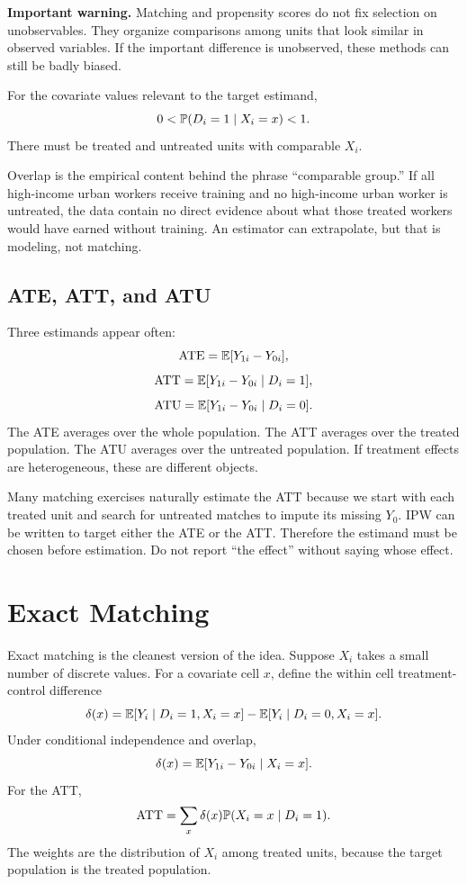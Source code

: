 \begin{boxF}
\textbf{Important warning.} Matching and propensity scores do not fix selection
on unobservables. They organize comparisons among units that look similar in
observed variables. If the important difference is unobserved, these methods
can still be badly biased.
\end{boxF}

\begin{assN}[Overlap]
For the covariate values relevant to the target estimand,
\[
    0 < \mathbb{P}(D_i=1\mid X_i=x) < 1.
\]
There must be treated and untreated units with comparable \(X_i\).
\end{assN}

Overlap is the empirical content behind the phrase ``comparable group.'' If all
high-income urban workers receive training and no high-income urban worker is
untreated, the data contain no direct evidence about what those treated workers
would have earned without training. An estimator can extrapolate, but that is
modeling, not matching.

\subsection{ATE, ATT, and ATU}

Three estimands appear often:
\[
    \mathrm{ATE} = \mathbb{E}[Y_{1i}-Y_{0i}],
\]
\[
    \mathrm{ATT} = \mathbb{E}[Y_{1i}-Y_{0i}\mid D_i=1],
\]
\[
    \mathrm{ATU} = \mathbb{E}[Y_{1i}-Y_{0i}\mid D_i=0].
\]
The ATE averages over the whole population. The ATT averages over the treated
population. The ATU averages over the untreated population. If treatment effects
are heterogeneous, these are different objects.

Many matching exercises naturally estimate the ATT because we start with each
treated unit and search for untreated matches to impute its missing \(Y_0\).
IPW can be written to target either the ATE or the ATT. Therefore the estimand
must be chosen before estimation. Do not report ``the effect'' without saying
whose effect.

\section{Exact Matching}

Exact matching is the cleanest version of the idea. Suppose \(X_i\) takes a
small number of discrete values. For a covariate cell \(x\), define the within
cell treatment-control difference
\[
    \delta(x)
    =
    \mathbb{E}[Y_i\mid D_i=1,X_i=x]
    -
    \mathbb{E}[Y_i\mid D_i=0,X_i=x].
\]
Under conditional independence and overlap,
\[
    \delta(x)
    =
    \mathbb{E}[Y_{1i}-Y_{0i}\mid X_i=x].
\]
For the ATT,
\[
    \mathrm{ATT}
    =
    \sum_x \delta(x)\mathbb{P}(X_i=x\mid D_i=1).
\]
The weights are the distribution of \(X_i\) among treated units, because the
target population is the treated population.

